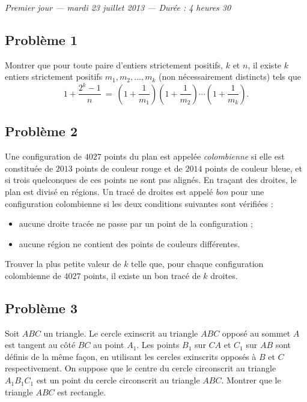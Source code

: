 
\begin{center}
  \emph{Premier jour --- mardi 23 juillet 2013 --- Durée : 4 heures 30}
\end{center}

\subsection*{Problème 1}
Montrer que pour toute paire d'entiers strictement positifs, $k$ et $n$, il existe $k$ entiers strictement
positifs $m_1, m_2, \ldots, m_k$ (non nécessairement distincts) tels que
\[
1 + \frac{2^k - 1}{n} \ = \ \left(1 + \frac{1}{m_1}\right)\left(1 + \frac{1}{m_2}\right)\cdots\left(1 + \frac{1}{m_k}\right).
\]

\subsection*{Problème 2}
Une configuration de $4027$ points du plan est appelée \emph{colombienne} si elle est constituée de $2013$
points de couleur rouge et de $2014$ points de couleur bleue, et si trois quelconques de ces points ne sont
pas alignés. En traçant des droites, le plan est divisé en régions. Un tracé de droites est appelé \emph{bon}
pour une configuration colombienne si les deux conditions suivantes sont vérifiées :
\begin{itemize}
  \item aucune droite tracée ne passe par un point de la configuration ;
  \item aucune région ne contient des points de couleurs différentes.
\end{itemize}
Trouver la plus petite valeur de $k$ telle que, pour chaque configuration colombienne de $4027$ points, il
existe un bon tracé de $k$ droites.

\subsection*{Problème 3}
Soit $ABC$ un triangle. Le cercle exinscrit au triangle $ABC$ opposé au sommet $A$ est tangent au côté $BC$ au
point $A_1$. Les points $B_1$ sur $CA$ et $C_1$ sur $AB$ sont définis de la même façon, en utilisant les
cercles exinscrits opposés à $B$ et $C$ respectivement. On suppose que le centre du cercle circonscrit au
triangle $A_1B_1C_1$ est un point du cercle circonscrit au triangle $ABC$. Montrer que le triangle $ABC$ est
rectangle.


